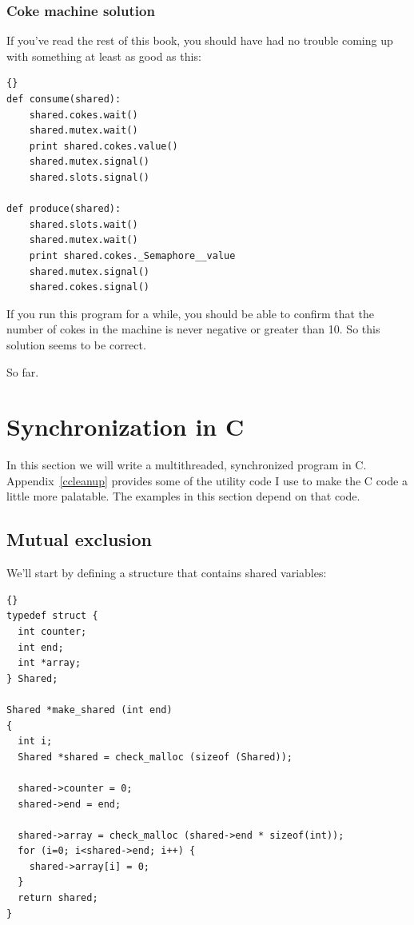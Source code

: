 \documentclass{book}
\newcommand{\clearemptydoublepage}{\newpage\cleardoublepage}
\begin{document}
\clearemptydoublepage
\subsection {Coke machine solution}

If you've read the rest of this book, you should have had no
trouble coming up with something at least as good as this:

\begin{lstlisting}[title={}]{}
def consume(shared):
    shared.cokes.wait()
    shared.mutex.wait()
    print shared.cokes.value()
    shared.mutex.signal()
    shared.slots.signal()

def produce(shared):
    shared.slots.wait()
    shared.mutex.wait()
    print shared.cokes._Semaphore__value
    shared.mutex.signal()
    shared.cokes.signal()
\end{lstlisting}

If you run this program for a while, you should be able to confirm
that the number of cokes in the machine is never negative or greater
than 10.  So this solution seems to be correct.

So far.


\chapter{Synchronization in C}
\label{csync}

In this section we will write a multithreaded, synchronized
program in C.  Appendix~\ref{ccleanup} provides some of the utility
code I use to make the C code a little more palatable.  The
examples in this section depend on that code.

\section{Mutual exclusion}

We'll start by defining a structure that contains shared
variables:

\begin{lstlisting}[title={}]{}
typedef struct {
  int counter;
  int end;
  int *array;
} Shared;

Shared *make_shared (int end)
{
  int i;
  Shared *shared = check_malloc (sizeof (Shared));

  shared->counter = 0;
  shared->end = end;

  shared->array = check_malloc (shared->end * sizeof(int));
  for (i=0; i<shared->end; i++) {
    shared->array[i] = 0;
  }
  return shared;
}
\end{lstlisting}
\end{document}
